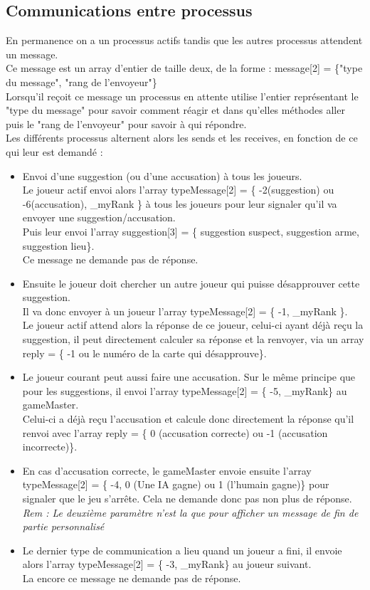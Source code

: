 \documentclass[a4paper,10pt]{article}
\begin{document}
	\subsection{Communications entre processus}
		En permanence on a un processus actifs tandis que les autres processus attendent un message.\\
		Ce message est un array d'entier de taille deux, de la forme : message[2] = \{"type du message", "rang de l'envoyeur"\}\\
		Lorsqu'il reçoit ce message un processus en attente utilise l'entier représentant le "type du message" pour savoir comment réagir et dans qu'elles méthodes aller puis le "rang de l'envoyeur" pour savoir à qui répondre.\\
		Les différents processus alternent alors les sends et les receives, en fonction de ce qui leur est demandé :
		\begin{itemize}
			\item Envoi d'une suggestion (ou d'une accusation) à tous les joueurs.\\
					Le joueur actif envoi alors l'array typeMessage[2] = \{ -2(suggestion) ou -6(accusation), \_myRank \} à tous les joueurs pour leur signaler qu'il va envoyer une suggestion/accusation.\\
					Puis leur envoi l'array suggestion[3] = \{ suggestion suspect, suggestion arme, suggestion lieu\}.\\
					Ce message ne demande pas de réponse.
			\item Ensuite le joueur doit chercher un autre joueur qui puisse désapprouver cette suggestion.\\
					Il va donc envoyer à un joueur l'array typeMessage[2] = \{ -1, \_myRank \}.\\
					Le joueur actif attend alors la réponse de ce joueur, celui-ci ayant déjà reçu la suggestion, il peut directement calculer sa réponse et la renvoyer, via un array reply = \{ -1 ou le numéro de la carte qui désapprouve\}.
			\item Le joueur courant peut aussi faire une accusation. Sur le même principe que pour les suggestions, il envoi l'array typeMessage[2] = \{ -5, \_myRank\} au gameMaster.\\
				Celui-ci a déjà reçu l'accusation et calcule donc directement la réponse qu'il renvoi avec l'array reply = \{ 0 (accusation correcte) ou -1 (accusation incorrecte)\}.
			\item En cas d'accusation correcte, le gameMaster envoie ensuite l'array typeMessage[2] = \{ -4, 0 (Une IA gagne) ou 1 (l'humain gagne)\} pour signaler que le jeu s’arrête. Cela ne demande donc pas non plus de réponse.\\
			\textit{Rem : Le deuxième paramètre n'est la que pour afficher un message de fin de partie personnalisé}
			\item Le dernier type de communication a lieu quand un joueur a fini, il envoie alors l'array typeMessage[2] = \{ -3, \_myRank\} au joueur suivant.\\
			La encore ce message ne demande pas de réponse.		
		\end{itemize}
\end{document}
